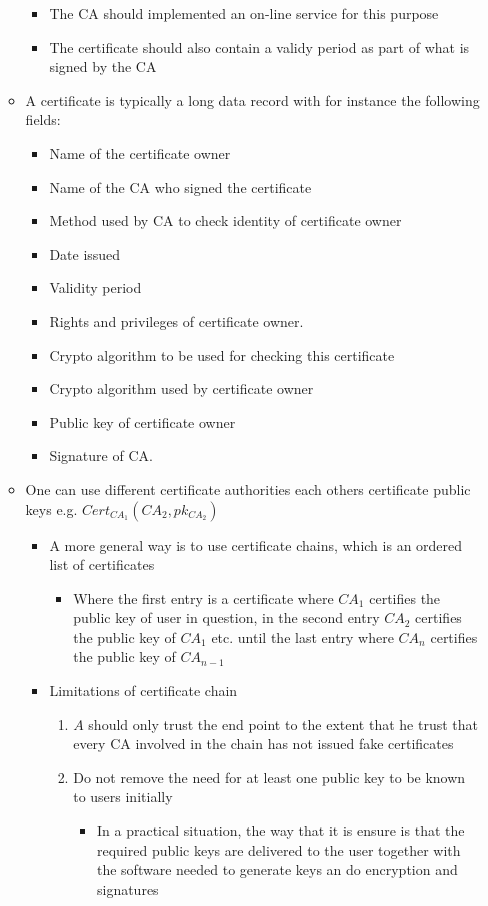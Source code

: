 \documentclass[11pt]{article}
\begin{document}
\begin{itemize}
\begin{itemize}
\begin{itemize}
\item The CA should implemented an on-line service for this purpose
\item The certificate should also contain a validy period as part of what is signed by the CA
\end{itemize}
\item A certificate is typically a long data record with for instance the following fields:
\begin{itemize}
\item Name of the certificate owner
\item Name of the CA who signed the certificate
\item Method used by CA to check identity of certificate owner
\item Date issued
\item Validity period
\item Rights and privileges of certificate owner.
\item Crypto algorithm to be used for checking this certificate
\item Crypto algorithm used by certificate owner
\item Public key of certificate owner
\item Signature of CA.
\end{itemize}
\item One can use different certificate authorities each others certificate public keys e.g. \(Cert_ {CA_1}(CA_2, pk_{CA_2})\)
\begin{itemize}
\item A more general way is to use certificate chains, which is an ordered list of certificates 
\begin{itemize}
\item Where the first entry is a certificate where \(CA_1\) certifies the public key of user in question, in the second entry \(CA_2\) certifies the public key of \(CA_1\) etc. until the last entry where \(CA_n\) certifies the public key of \(CA_{n-1}\)
\end{itemize}
\item Limitations of certificate chain
\begin{enumerate}
\item \(A\) should only trust the end point to the extent that he trust that every CA involved in the chain has not issued fake certificates
\item Do not remove the need for at least one public key to be known to users initially 
\begin{itemize}
\item In a practical situation, the way that it is ensure is that the required public keys are delivered to the user together with the software needed to generate keys an do encryption and signatures
\end{itemize}
\end{enumerate}
\end{itemize}
\end{itemize}
\end{itemize}
\end{document}
